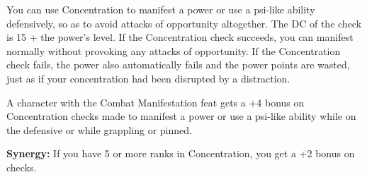 You can use Concentration to manifest a power or use a psi-like ability defensively, so as to avoid attacks of opportunity altogether. The DC of the check is 15 + the power's level. If the Concentration check succeeds, you can manifest normally without provoking any attacks of opportunity. If the Concentration check fails, the power also automatically fails and the power points are wasted, just as if your concentration had been disrupted by a distraction.

A character with the Combat Manifestation feat gets a +4 bonus on Concentration checks made to manifest a power or use a psi-like ability while on the defensive or while grappling or pinned.

\textbf{Synergy:} If you have 5 or more ranks in Concentration, you get a +2 bonus on  checks.